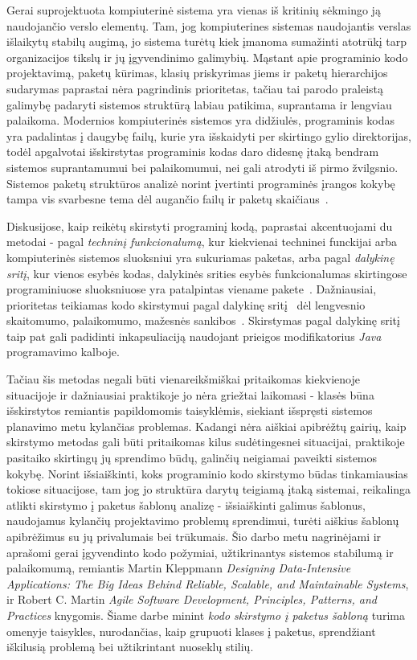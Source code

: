 Gerai suprojektuota kompiuterinė sistema yra vienas iš kritinių sėkmingo ją naudojančio verslo
elementų.
Tam, jog kompiuterines sistemas naudojantis verslas išlaikytų stabilų augimą, jo sistema turėtų kiek įmanoma sumažinti
atotrūkį tarp organizacijos tikslų ir jų įgyvendinimo galimybių.
Mąstant apie programinio kodo
projektavimą, paketų kūrimas, klasių priskyrimas jiems ir paketų hierarchijos sudarymas paprastai
nėra pagrindinis prioritetas, tačiau tai parodo praleistą galimybę padaryti sistemos struktūrą labiau
patikima, suprantama ir lengviau palaikoma.
Modernios kompiuterinės sistemos yra didžiulės, programinis kodas yra padalintas į daugybę failų,
kurie yra išskaidyti per skirtingo gylio direktorijas, todėl apgalvotai išskirstytas programinis
kodas daro didesnę įtaką bendram sistemos suprantamumui bei palaikomumui, nei gali atrodyti iš pirmo žvilgsnio.
Sistemos paketų struktūros analizė norint įvertinti programinės įrangos kokybę
tampa vis svarbesne tema dėl augančio failų ir paketų skaičiaus~\cite{DesignMetrics}.

Diskusijose, kaip reikėtų skirstyti programinį kodą, paprastai akcentuojami du metodai - pagal \textit{techninį funkcionalumą},
kur kiekvienai techninei funckijai arba kompiuterinės sistemos sluoksniui yra sukuriamas paketas,
arba pagal \textit{dalykinę sritį}, kur vienos esybės kodas, dalykinės srities
esybės funkcionalumas skirtingose programiniuose sluoksniuose yra patalpintas viename pakete~\cite{PackagingWays}.
Dažniausiai, prioritetas teikiamas kodo skirstymui pagal dalykinę sritį~\cite{DomainDrivenDesign} dėl lengvesnio skaitomumo,
palaikomumo, mažesnės sankibos~\cite{DivideByDomain}.
Skirstymas pagal dalykinę sritį taip pat gali padidinti
inkapsuliaciją naudojant prieigos modifikatorius \textit{Java} programavimo kalboje.

Tačiau šis metodas negali būti vienareikšmiškai pritaikomas kiekvienoje situacijoje ir dažniausiai praktikoje jo nėra griežtai laikomasi -
klasės būna išskirstytos remiantis papildomomis taisyklėmis,
siekiant išspręsti sistemos planavimo metu kylančias problemas.
Kadangi nėra aiškiai apibrėžtų gairių, kaip skirstymo metodas gali būti pritaikomas kilus sudėtingesnei situacijai, praktikoje pasitaiko skirtingų
jų sprendimo būdų, galinčių neigiamai paveikti sistemos kokybę.
Norint išsiaiškinti, koks programinio kodo skirstymo būdas tinkamiausias tokiose situacijose,
tam jog jo struktūra darytų teigiamą įtaką sistemai, reikalinga atlikti skirstymo į paketus šablonų analizę -
išsiaiškinti galimus šablonus, naudojamus kylančių projektavimo problemų sprendimui, turėti aiškius šablonų apibrėžimus su jų
privalumais bei trūkumais.
Šio darbo metu nagrinėjami ir aprašomi gerai įgyvendinto kodo požymiai, užtikrinantys
sistemos stabilumą ir palaikomumą, remiantis Martin Kleppmann \textit{Designing Data-Intensive Applications: The Big Ideas Behind Reliable, Scalable, and Maintainable Systems},
ir Robert C. Martin \textit{Agile Software Development, Principles, Patterns, and Practices} knygomis.
Šiame darbe minint \textit{kodo skirstymo į paketus šabloną} turima omenyje taisykles,
nurodančias, kaip grupuoti klases į paketus, sprendžiant iškilusią problemą bei užtikrintant nuoseklų stilių.

